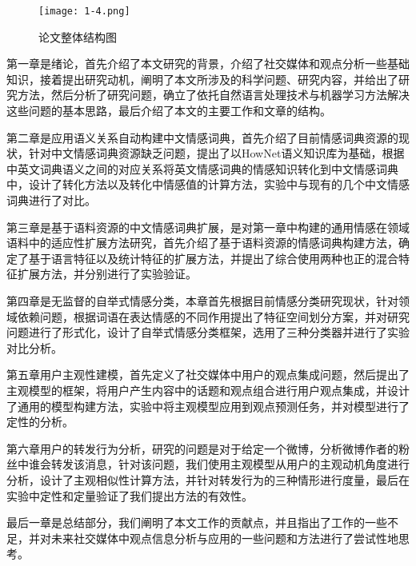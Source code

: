 \begin{figure}[htp]
\centering
\texttt{[image: 1-4.png]}
\caption{论文整体结构图}
\label{fig1-4}
\end{figure}

第一章是绪论，首先介绍了本文研究的背景，介绍了社交媒体和观点分析一些基础知识，接着提出研究动机，阐明了本文所涉及的科学问题、研究内容，并给出了研究方法，然后分析了研究问题，确立了依托自然语言处理技术与机器学习方法解决这些问题的基本思路，最后介绍了本文的主要工作和文章的结构。

第二章是应用语义关系自动构建中文情感词典，首先介绍了目前情感词典资源的现状，针对中文情感词典资源缺乏问题，提出了以HowNet语义知识库为基础，根据中英文词典语义之间的对应关系将英文情感词典的情感知识转化到中文情感词典中，设计了转化方法以及转化中情感值的计算方法，实验中与现有的几个中文情感词典进行了对比。

第三章是基于语料资源的中文情感词典扩展，是对第一章中构建的通用情感在领域语料中的适应性扩展方法研究，首先介绍了基于语料资源的情感词典构建方法，确定了基于语言特征以及统计特征的扩展方法，并提出了综合使用两种也正的混合特征扩展方法，并分别进行了实验验证。

第四章是无监督的自举式情感分类，本章首先根据目前情感分类研究现状，针对领域依赖问题，根据词语在表达情感的不同作用提出了特征空间划分方案，并对研究问题进行了形式化，设计了自举式情感分类框架，选用了三种分类器并进行了实验对比分析。

第五章用户主观性建模，首先定义了社交媒体中用户的观点集成问题，然后提出了主观模型的框架，将用户产生内容中的话题和观点组合进行用户观点集成，并设计了通用的模型构建方法，实验中将主观模型应用到观点预测任务，并对模型进行了定性的分析。

第六章用户的转发行为分析，研究的问题是对于给定一个微博，分析微博作者的粉丝中谁会转发该消息，针对该问题，我们使用主观模型从用户的主观动机角度进行分析，设计了主观相似性计算方法，并针对转发行为的三种情形进行度量，最后在实验中定性和定量验证了我们提出方法的有效性。

最后一章是总结部分，我们阐明了本文工作的贡献点，并且指出了工作的一些不足，并对未来社交媒体中观点信息分析与应用的一些问题和方法进行了尝试性地思考。


